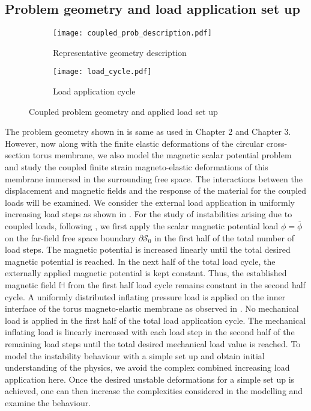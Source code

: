 \subsection{Problem geometry and load application set up}
\label{sec:load_setup}

\begin{figure}[h]
\centering
\begin{subfigure}{0.55\textwidth}
\centering
\texttt{[image: coupled\_prob\_description.pdf]}
\caption{Representative geometry description}
\label{fig:3.6.1}
\end{subfigure}
\begin{subfigure}{0.44\textwidth}
\centering
\texttt{[image: load\_cycle.pdf]}
\caption{Load application cycle}
\label{fig:3.6.2}
\end{subfigure}
\caption{Coupled problem geometry and applied load set up}
\label{fig:3.6}
\end{figure}

The problem geometry shown in  is same as used in Chapter 2 and Chapter 3. However, now along with the finite elastic deformations of the circular cross-section torus membrane, we also model the magnetic scalar potential problem and study the coupled finite strain magneto-elastic deformations of this membrane immersed in the surrounding free space. The interactions between the displacement and magnetic fields and the response of the material for the coupled loads will be examined. We consider the external load application in uniformly increasing load steps as shown in . For the study of instabilities arising due to coupled loads, following \cite{reddy_toroid}, we first apply the scalar magnetic potential load $\phi = \overline{\phi}$ on the far-field free space boundary $\partial \mathcal{S}_0$ in the first half of the total number of load steps. The magnetic potential is increased linearly until the total desired magnetic potential is reached. In the next half of the total load cycle, the externally applied magnetic potential is kept constant. Thus, the established magnetic field $\mathbb{H}$ from the first half load cycle remains constant in the second half cycle. A uniformly distributed inflating pressure load is applied on the inner interface of the torus magneto-elastic membrane as observed in . No mechanical load is applied in the first half of the total load application cycle. The  mechanical inflating load is linearly increased with each load step in the second half of the remaining load steps until the total desired mechanical load value is reached. To model the instability behaviour with a simple set up and obtain initial understanding of the physics, we avoid the complex combined increasing load application here. Once the desired unstable deformations for a simple set up is achieved, one can then increase the complexities considered in the modelling and examine the behaviour. 

